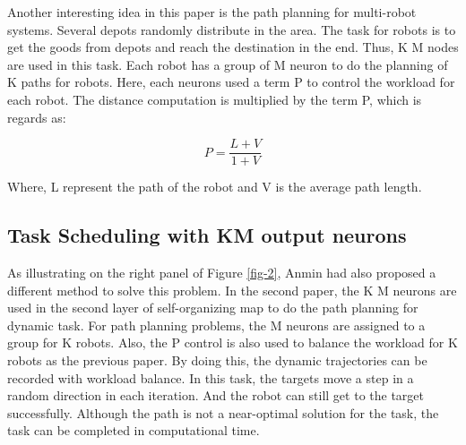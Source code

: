 Another interesting idea in this paper is the path planning for multi-robot systems. Several depots randomly distribute in the area. The task for robots is to get the goods from depots and reach the destination in the end. Thus, K M nodes are used in this task. Each robot has a group of M neuron to do the planning of K paths for robots. Here, each neurons used a term P to control the workload for each robot. The distance computation is multiplied by the term P, which is regards as:

\begin{equation}
    P = \frac{{L + V}}{{1 + V}}
\end{equation}

Where, L represent the path of the robot and V is the average path length. 
\subsection{Task Scheduling with KM output neurons}
As illustrating on the right panel of Figure \ref{fig-2}, Anmin had also proposed a different method to solve this problem. In the second paper\cite{zhu2006neural}, the K M neurons are used in the second layer of self-organizing map to do the path planning for dynamic task. For path planning problems, the M neurons are assigned to a group for K robots. Also, the P control is also used to balance the workload for K robots as the previous paper. By doing this, the dynamic trajectories can be recorded with workload balance.  In this task, the targets move a step in a random direction in each iteration. And the robot can still get to the target successfully. Although the path is not a near-optimal solution for the task, the task can be completed in computational time. 